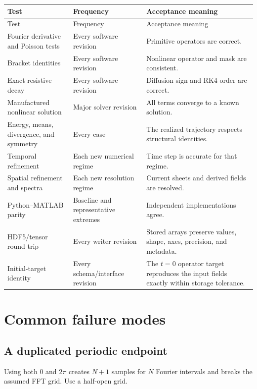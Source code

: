 \documentclass[11pt]{article}
\begin{document}
\begin{longtable}{p{}p{}p{}}
\toprule
Test & Frequency & Acceptance meaning \\
\midrule
\endfirsthead
\toprule
Test & Frequency & Acceptance meaning \\
\midrule
\endhead
Fourier derivative and Poisson tests & Every software revision & Primitive operators are correct. \\
Bracket identities & Every software revision & Nonlinear operator and mask are consistent. \\
Exact resistive decay & Every software revision & Diffusion sign and RK4 order are correct. \\
Manufactured nonlinear solution & Major solver revision & All terms converge to a known solution. \\
\makecell[l]{Energy, means,\\divergence, and symmetry} & Every case & The realized trajectory respects structural identities. \\
Temporal refinement & Each new numerical regime & Time step is accurate for that regime. \\
Spatial refinement and spectra & Each new resolution regime & Current sheets and derived fields are resolved. \\
Python--MATLAB parity & Baseline and representative extremes & Independent implementations agree. \\
HDF5/tensor round trip & Every writer revision & Stored arrays preserve values, shape, axes, precision, and metadata. \\Initial-target identity & Every schema/interface revision & The $t=0$ operator target reproduces the input fields exactly within storage tolerance. \\
\bottomrule
\end{longtable}

\section{Common failure modes}
\label{sec:failures}

\subsection{A duplicated periodic endpoint}

Using both $0$ and $2\pi$ creates $N+1$ samples for $N$ Fourier intervals and breaks the assumed FFT grid. Use a half-open grid.
\end{document}
